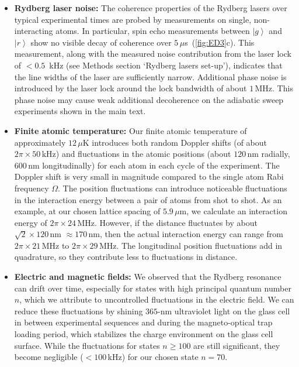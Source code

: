 \documentclass[prl,nobalancelastpage,twocolumn,superscriptaddress,nofootinbib]{revtex4}
\newcommand{\ket}[1]{\left|#1\right\rangle}
\begin{document}
\begin{footnotesize}
\begin{itemize}
  \item \textbf{Rydberg laser noise:} The coherence properties of the Rydberg
      lasers over typical experimental times are probed by measurements on
      single, non-interacting atoms. In particular, spin echo measurements
      between $\ket{g}$ and $\ket{r}$ show no visible decay of coherence over
      $5\,\mu$s~(\ref{fig:ED3}c). This measurement, along with the measured
      noise contribution from the laser lock of $< 0.5$~kHz (see Methods section
      `Rydberg lasers set-up'), indicates that the line widths of the laser are
      sufficiently narrow. Additional phase noise is introduced by the laser
      lock around the lock bandwidth of about $1\,$MHz. This phase noise may
      cause weak additional decoherence on the adiabatic sweep experiments
      shown in the main text.


  \item \textbf{Finite atomic temperature:} Our finite atomic temperature of
      approximately $12\,\mu$K introduces both random Doppler shifts (of about
      $2\pi \times 50\,$kHz) and fluctuations in the atomic positions (about
      $120\,$nm radially, $600\,$nm longitudinally) for each atom in each cycle
      of the experiment. The Doppler shift is very small in magnitude compared
      to the single atom Rabi frequency $\Omega$. The position fluctuations can
      introduce noticeable fluctuations in the interaction energy between a
      pair of atoms from shot to shot. As an example, at our chosen lattice
      spacing of $5.9\,\mu$m, we calculate an interaction energy of $2\pi
      \times 24\,$MHz. However, if the distance fluctuates by about
      $\sqrt{2}\times120\,$nm $\approx 170\,$nm, then the actual interaction
      energy can range from $2\pi\times 21\,$MHz to $2\pi\times29\,$MHz. The
      longitudinal position fluctuations add in quadrature, so they contribute
      less to fluctuations in distance.

  \item \textbf{Electric and magnetic fields:} We observed that the
      Rydberg resonance can drift over time, especially for states with high
      principal quantum number $n$, which we attribute to uncontrolled
      fluctuations in the electric field. We can reduce these fluctuations by
      shining $365$-nm ultraviolet light on the glass cell in between experimental
      sequences and during the magneto-optical trap loading period, which
      stabilizes the charge environment on the glass cell surface. While the
      fluctuations for states $n \geq 100$ are still significant, they become
      negligible ($< 100\,$kHz) for our chosen state $n=70$.
    

\end{itemize}
\end{footnotesize}
\end{document}
